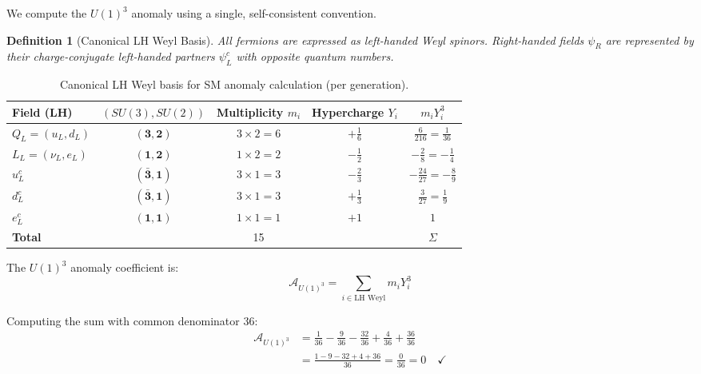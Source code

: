 \documentclass[11pt,a4paper]{article}
\newtheorem{definition}[theorem]{Definition}
\begin{document}
We compute the $U(1)^3$ anomaly using a single, self-consistent convention.

\begin{definition}[Canonical LH Weyl Basis]
\label{def:lh-weyl-basis}
All fermions are expressed as left-handed Weyl spinors. Right-handed fields $\psi_R$ are represented by their charge-conjugate left-handed partners $\psi^c_L$ with opposite quantum numbers.
\end{definition}

\begin{table}[h]
\centering
\caption{Canonical LH Weyl basis for SM anomaly calculation (per generation).}
\label{tab:canonical-lh-weyl}
\begin{tabular}{lcccc}
\toprule
Field (LH) & $(SU(3), SU(2))$ & Multiplicity $m_i$ & Hypercharge $Y_i$ & $m_i Y_i^3$ \\
\midrule
$Q_L = (u_L, d_L)$ & $(\mathbf{3}, \mathbf{2})$ & $3 \times 2 = 6$ & $+\frac{1}{6}$ & $\frac{6}{216} = \frac{1}{36}$ \\
$L_L = (\nu_L, e_L)$ & $(\mathbf{1}, \mathbf{2})$ & $1 \times 2 = 2$ & $-\frac{1}{2}$ & $-\frac{2}{8} = -\frac{1}{4}$ \\
$u^c_L$ & $(\bar{\mathbf{3}}, \mathbf{1})$ & $3 \times 1 = 3$ & $-\frac{2}{3}$ & $-\frac{24}{27} = -\frac{8}{9}$ \\
$d^c_L$ & $(\bar{\mathbf{3}}, \mathbf{1})$ & $3 \times 1 = 3$ & $+\frac{1}{3}$ & $\frac{3}{27} = \frac{1}{9}$ \\
$e^c_L$ & $(\mathbf{1}, \mathbf{1})$ & $1 \times 1 = 1$ & $+1$ & $1$ \\
\midrule
\textbf{Total} & & 15 & & $\Sigma$ \\
\bottomrule
\end{tabular}
\end{table}

The $U(1)^3$ anomaly coefficient is:
\begin{equation}
\label{eq:u1-3-def-oneshot}
\mathcal{A}_{U(1)^3} = \sum_{i \in \text{LH Weyl}} m_i Y_i^3
\end{equation}

Computing the sum with common denominator 36:
\begin{align}
\label{eq:u1-3-sum-oneshot}
\mathcal{A}_{U(1)^3} &= \frac{1}{36} - \frac{9}{36} - \frac{32}{36} + \frac{4}{36} + \frac{36}{36} \\
\label{eq:u1-3-result-oneshot}
&= \frac{1 - 9 - 32 + 4 + 36}{36} = \frac{0}{36} = 0 \quad \checkmark
\end{align}
\end{document}
